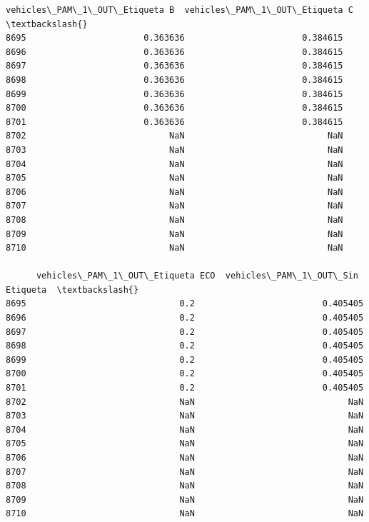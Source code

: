 \documentclass[11pt]{article}
\begin{document}
\begin{tcolorbox}[breakable, size=fbox, boxrule=.5pt, pad at break*=1mm, opacityfill=0]
\begin{Verbatim}[commandchars=\\\{\}]
      vehicles\_PAM\_1\_OUT\_Etiqueta B  vehicles\_PAM\_1\_OUT\_Etiqueta C  \textbackslash{}
8695                       0.363636                       0.384615
8696                       0.363636                       0.384615
8697                       0.363636                       0.384615
8698                       0.363636                       0.384615
8699                       0.363636                       0.384615
8700                       0.363636                       0.384615
8701                       0.363636                       0.384615
8702                            NaN                            NaN
8703                            NaN                            NaN
8704                            NaN                            NaN
8705                            NaN                            NaN
8706                            NaN                            NaN
8707                            NaN                            NaN
8708                            NaN                            NaN
8709                            NaN                            NaN
8710                            NaN                            NaN

      vehicles\_PAM\_1\_OUT\_Etiqueta ECO  vehicles\_PAM\_1\_OUT\_Sin Etiqueta  \textbackslash{}
8695                              0.2                         0.405405
8696                              0.2                         0.405405
8697                              0.2                         0.405405
8698                              0.2                         0.405405
8699                              0.2                         0.405405
8700                              0.2                         0.405405
8701                              0.2                         0.405405
8702                              NaN                              NaN
8703                              NaN                              NaN
8704                              NaN                              NaN
8705                              NaN                              NaN
8706                              NaN                              NaN
8707                              NaN                              NaN
8708                              NaN                              NaN
8709                              NaN                              NaN
8710                              NaN                              NaN


\end{Verbatim}
\end{tcolorbox}
\end{document}
